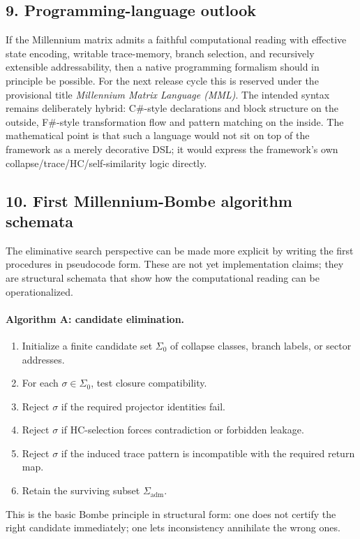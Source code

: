 \subsection*{9. Programming-language outlook}
If the Millennium matrix admits a faithful computational reading with effective state encoding, writable trace-memory, branch selection, and recursively extensible addressability, then a native programming formalism should in principle be possible. For the next release cycle this is reserved under the provisional title \emph{Millennium Matrix Language (MML)}. The intended syntax remains deliberately hybrid: C\#-style declarations and block structure on the outside, F\#-style transformation flow and pattern matching on the inside. The mathematical point is that such a language would not sit on top of the framework as a merely decorative DSL; it would express the framework's own collapse/trace/HC/self-similarity logic directly.


\subsection*{10. First Millennium-Bombe algorithm schemata}
The eliminative search perspective can be made more explicit by writing the first procedures in pseudocode form. These are not yet implementation claims; they are structural schemata that show how the computational reading can be operationalized.

\paragraph{Algorithm A: candidate elimination.}
\begin{enumerate}[leftmargin=2em,label=\arabic*.]
  \item Initialize a finite candidate set $\Sigma_0$ of collapse classes, branch labels, or sector addresses.
  \item For each $\sigma\in\Sigma_0$, test closure compatibility.
  \item Reject $\sigma$ if the required projector identities fail.
  \item Reject $\sigma$ if HC-selection forces contradiction or forbidden leakage.
  \item Reject $\sigma$ if the induced trace pattern is incompatible with the required return map.
  \item Retain the surviving subset $\Sigma_{\mathrm{adm}}$.
\end{enumerate}
This is the basic Bombe principle in structural form: one does not certify the right candidate immediately; one lets inconsistency annihilate the wrong ones.

